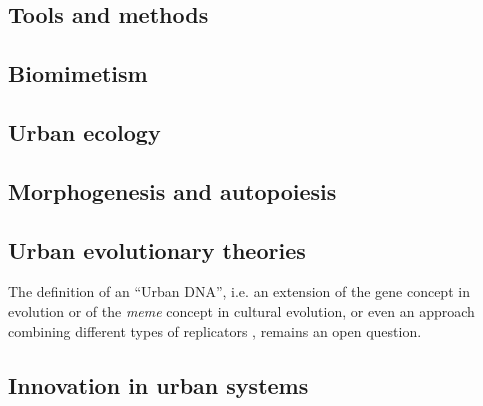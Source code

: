 \documentclass[letterpaper]{article}
\begin{document}


\subsection{Tools and methods}




\subsection{Biomimetism}


\cite{taylor2017art}


\subsection{Urban ecology}



\subsection{Morphogenesis and autopoiesis}






\subsection{Urban evolutionary theories}



The definition of an ``Urban DNA'', i.e. an extension of the gene concept in evolution or of the \emph{meme} concept in cultural evolution, or even an approach combining different types of replicators \cite{bull2000meme}, remains an open question.



\subsection{Innovation in urban systems}

\end{document}
